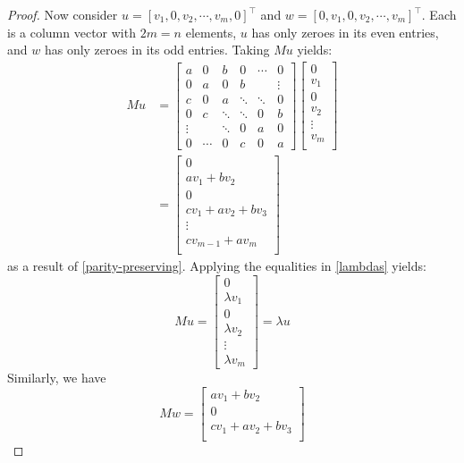 \documentclass[10pt,twocolumn]{article}
\begin{document}
\begin{proof}
    Now consider $u=[v_1,0,v_2,\cdots,v_m,0]^\intercal$ and $w=[0,v_1,0,v_2,\cdots,v_m]^\intercal$. Each is a column vector with $2m=n$ elements, $u$ has only zeroes in its even entries, and $w$ has only zeroes in its odd entries. Taking $Mu$ yields:
    \begin{align*}
    Mu&=
        \begin{bmatrix}
a & 0 & b & 0 & \cdots & 0 \\
0 & a & 0 & b &  & \vdots \\
c & 0 & a & \ddots & \ddots & 0 \\
0 & c & \ddots & \ddots & 0 & b \\
\vdots &  & \ddots & 0 & a & 0 \\
0 & \cdots & 0 & c & 0 & a 
\end{bmatrix} 
    \begin{bmatrix}
        0\\
        v_1\\
        0\\
        v_2\\
        \vdots\\
        v_m\\
    \end{bmatrix}\\&=\begin{bmatrix}
        0\\
        av_1 + bv_2 \\
        0 \\
        cv_1 + av_2 + bv_3 \\
        \vdots \\
        cv_{m-1} + av_m \\
    \end{bmatrix} 
    \end{align*}
    as a result of \ref{parity-preserving}. Applying the equalities in \ref{lambdas} yields:
    $$Mu=\begin{bmatrix}
        0\\
        \lambda v_1 \\
        0\\
        \lambda v_2 \\
        \vdots \\
        \lambda v_m
    \end{bmatrix}
    =\lambda u$$
    Similarly, we have $$
    Mw=\begin{bmatrix}
        av_1 + bv_2 \\
        0 \\
        cv_1 + av_2 + bv_3 \\

\end{bmatrix}$$
\end{proof}
\end{document}

